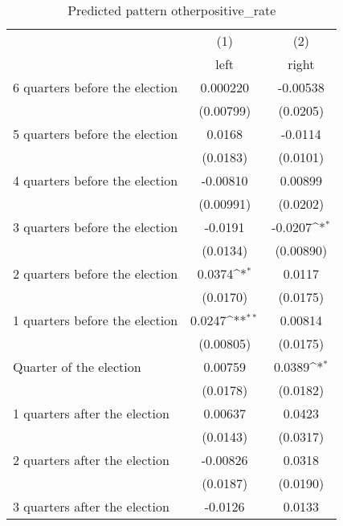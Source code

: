 \begin{table}[htbp]\centering
\def\sym#1{\ifmmode^{#1}\else\(^{#1}\)\fi}
\caption{Predicted pattern otherpositive\_rate}
\begin{tabular}{l*{2}{c}}
\hline\hline
                    &\multicolumn{1}{c}{(1)}&\multicolumn{1}{c}{(2)}\\
                    &\multicolumn{1}{c}{left}&\multicolumn{1}{c}{right}\\
\hline
 6 quarters before the election&    0.000220         &    -0.00538         \\
                    &   (0.00799)         &    (0.0205)         \\
[1em]
 5 quarters before the election&      0.0168         &     -0.0114         \\
                    &    (0.0183)         &    (0.0101)         \\
[1em]
 4 quarters before the election&    -0.00810         &     0.00899         \\
                    &   (0.00991)         &    (0.0202)         \\
[1em]
 3 quarters before the election&     -0.0191         &     -0.0207\sym{*}  \\
                    &    (0.0134)         &   (0.00890)         \\
[1em]
 2 quarters before the election&      0.0374\sym{*}  &      0.0117         \\
                    &    (0.0170)         &    (0.0175)         \\
[1em]
 1 quarters before the election&      0.0247\sym{**} &     0.00814         \\
                    &   (0.00805)         &    (0.0175)         \\
[1em]
Quarter of the election&     0.00759         &      0.0389\sym{*}  \\
                    &    (0.0178)         &    (0.0182)         \\
[1em]
 1 quarters after the election&     0.00637         &      0.0423         \\
                    &    (0.0143)         &    (0.0317)         \\
[1em]
 2 quarters after the election&    -0.00826         &      0.0318         \\
                    &    (0.0187)         &    (0.0190)         \\
[1em]
 3 quarters after the election&     -0.0126         &      0.0133         \\

\end{tabular}
\end{table}
